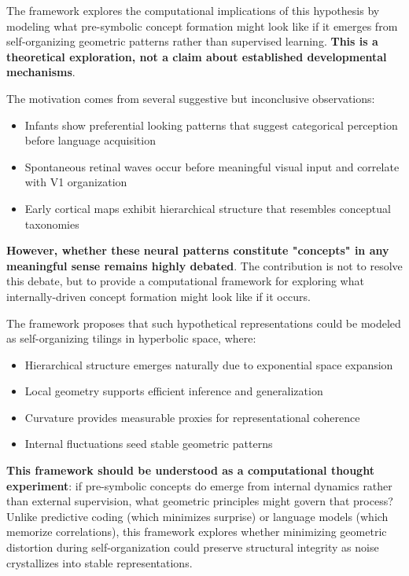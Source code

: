 \documentclass[10pt]{article}
\begin{document}
The framework explores the computational implications of this hypothesis by modeling what pre-symbolic concept formation might look like if it emerges from self-organizing geometric patterns rather than supervised learning. \textbf{This is a theoretical exploration, not a claim about established developmental mechanisms}.

The motivation comes from several suggestive but inconclusive observations:
\begin{itemize}
    \item Infants show preferential looking patterns that suggest categorical perception before language acquisition
    \item Spontaneous retinal waves occur before meaningful visual input and correlate with V1 organization
    \item Early cortical maps exhibit hierarchical structure that resembles conceptual taxonomies
\end{itemize}

\textbf{However, whether these neural patterns constitute "concepts" in any meaningful sense remains highly debated}. The contribution is not to resolve this debate, but to provide a computational framework for exploring what internally-driven concept formation might look like if it occurs.

The framework proposes that such hypothetical representations could be modeled as self-organizing tilings in hyperbolic space, where:
\begin{itemize}
    \item Hierarchical structure emerges naturally due to exponential space expansion
    \item Local geometry supports efficient inference and generalization  
    \item Curvature provides measurable proxies for representational coherence
    \item Internal fluctuations seed stable geometric patterns
\end{itemize}

\textbf{This framework should be understood as a computational thought experiment}: if pre-symbolic concepts do emerge from internal dynamics rather than external supervision, what geometric principles might govern that process? Unlike predictive coding (which minimizes surprise) or language models (which memorize correlations), this framework explores whether minimizing geometric distortion during self-organization could preserve structural integrity as noise crystallizes into stable representations.
\end{document}
